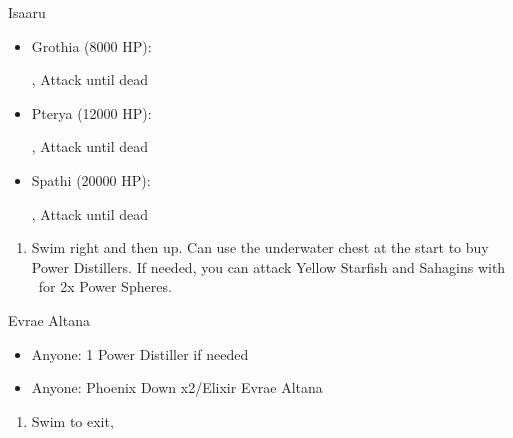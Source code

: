 \begin{battle}{Isaaru}
	\begin{itemize}
		\item Grothia (8000 HP):
		      \begin{itemize}
			      \summon{\shiva}, Attack until dead
		      \end{itemize}
		\item Pterya (12000 HP):
		      \begin{itemize}
			      \summon{\shiva}, Attack until dead
		      \end{itemize}
		\item Spathi (20000 HP):
		      \begin{itemize}
			      \summon{\shiva}, Attack until dead
		      \end{itemize}
	\end{itemize}
\end{battle}
\begin{enumerate}[resume]
	\item Swim right and then up. Can use the underwater chest at the start to buy Power Distillers. If needed, you can attack Yellow Starfish and Sahagins with \tidus\ for 2x Power Spheres.
\end{enumerate}
\begin{battle}{Evrae Altana}
	\begin{itemize}
		\item Anyone: 1 Power Distiller if needed
		\item Anyone: Phoenix Down x2/Elixir Evrae Altana
	\end{itemize}
\end{battle}
\begin{enumerate}[resume]
	\item Swim to exit, \sd
\end{enumerate}
\newpage